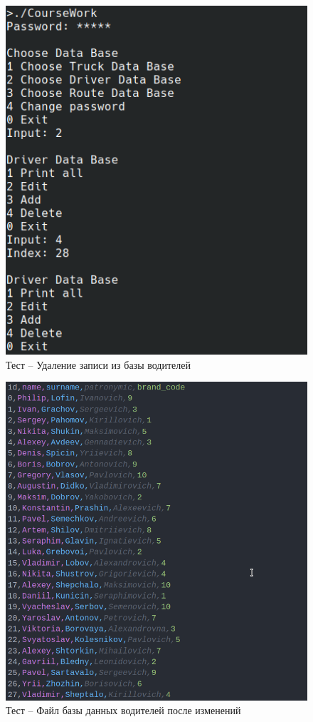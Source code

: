 \begin{figure}[H]
	\centering
	\includegraphics[width=0.8\linewidth]{photo/tests/admin/driver_db_delete}
	\caption{Тест -- Удаление записи из базы водителей}
	\label{driver_db_delete}
\end{figure}

\begin{figure}[H]
	\centering
	\includegraphics[width=0.7\linewidth]{photo/tests/admin/driver_db_state_init}
	\caption{Тест -- Файл базы данных водителей после изменений}
	\label{driver_db_state_init3}
\end{figure}

